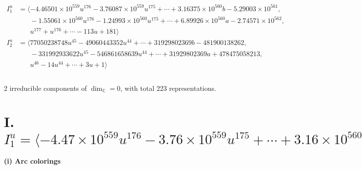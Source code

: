 \documentclass[1p]{elsarticle_modified}
\theoremstyle{definition}
\begin{document}
\begin{align*}
I^u_{1}&=\langle 
-4.46501\times10^{559} u^{176}-3.76087\times10^{559} u^{175}+\cdots+3.16375\times10^{560} b-5.29003\times10^{561},\\
\phantom{I^u_{1}}&\phantom{= \langle  }-1.55061\times10^{560} u^{176}-1.24993\times10^{560} u^{175}+\cdots+6.89926\times10^{560} a-2.74571\times10^{562},\\
\phantom{I^u_{1}}&\phantom{= \langle  }u^{177}+u^{176}+\cdots-113 u+181\rangle \\
I^u_{2}&=\langle 
77050238748 u^{45}-49060443352 u^{44}+\cdots+31929802369 b-481900138262,\\
\phantom{I^u_{2}}&\phantom{= \langle  }-331992933622 u^{45}-546861658639 u^{44}+\cdots+31929802369 a+478475058213,\\
\phantom{I^u_{2}}&\phantom{= \langle  }u^{46}-14 u^{44}+\cdots+3 u+1\rangle \\
\\
\end{align*}
\raggedright * 2 irreducible components of $\dim_{\mathbb{C}}=0$, with total 223 representations.\\
\newpage
\renewcommand{\arraystretch}{1}
\centering \section*{I. $I^u_{1}= \langle -4.47\times10^{559} u^{176}-3.76\times10^{559} u^{175}+\cdots+3.16\times10^{560} b-5.29\times10^{561},\;-1.55\times10^{560} u^{176}-1.25\times10^{560} u^{175}+\cdots+6.90\times10^{560} a-2.75\times10^{562},\;u^{177}+u^{176}+\cdots-113 u+181 \rangle$}
\flushleft \textbf{(i) Arc colorings}\\
\end{document}
